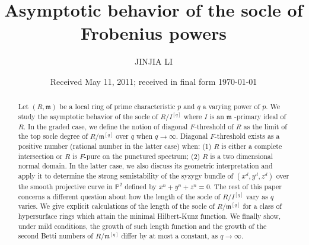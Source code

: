 \documentclass[draft]{amsart}
\theoremstyle{definition}
\numberwithin{equation}{theorem}
\begin{document}
\title[Asymptotic behavior of the socle of Frobenius powers]{Asymptotic behavior of the socle of Frobenius powers}
\author{JINJIA LI}
\address{Department of Mathematics\\ 328 Natural Sciences Building\\ University of Louisville\\ Louisville, KY 40292\\ USA}

\date{Received May 11, 2011; received in final form \today}


\begin{abstract}
Let $(R, {\mathfrak{m}})$ be a local ring of prime characteristic $p$ and $q$ a varying power of $p$. We study the asymptotic behavior of the socle of $R/I^{[q]}$ where $I$ is an ${\mathfrak{m}}$ -primary ideal of $R$. In the graded case, we define the notion of diagonal $F$-threshold of $R$ as the limit of the top socle degree of  $R/{\mathfrak{m}}^{[q]}$ over $q$ when $q \to \infty$. Diagonal $F$-threshold exists as a positive number (rational number in the latter case) when: (1) $R$ is either a complete intersection or $R$ is $F$-pure on the punctured spectrum; (2) $R$ is a two dimensional normal domain. In the latter case, we also discuss its geometric interpretation and apply it to determine the strong semistability of the syzygy bundle of $(x^d, y^d,z^d)$ over the smooth projective curve in $\mathbb P^2$ defined by $x^n+y^n+z^n=0$. The rest of this paper concerns a different question about how the length of the socle of $R/I^{[q]}$ vary as $q$ varies. We give explicit calculations of the length of the socle of $R/{\mathfrak{m}}^{[q]}$ for a class of hypersurface rings which attain the minimal Hilbert-Kunz function. We finally show, under mild conditions, the growth of such length function and the growth of the second Betti numbers of $R/{\mathfrak{m}}^{[q]}$  differ by at most a constant, as $q \to \infty$.
\end{abstract}

\maketitle
\end{document}

